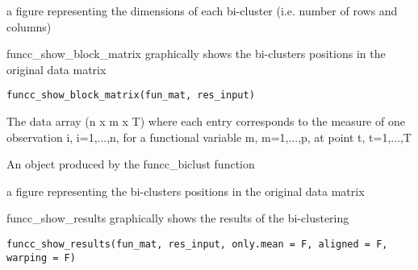 \documentclass[a4paper]{book}
\begin{document}
%
\begin{Value}
a figure representing the dimensions of each bi-cluster (i.e. number of rows and columns)
\end{Value}
%
\begin{Description}\relax
funcc\_show\_block\_matrix graphically shows the bi-clusters positions in the original data matrix
\end{Description}
%
\begin{Usage}
\begin{verbatim}
funcc_show_block_matrix(fun_mat, res_input)
\end{verbatim}
\end{Usage}
%
\begin{Arguments}
\begin{ldescription}
\item[\code{fun\_mat}] The data array (n x m x T) where each entry corresponds to the measure of one observation i, i=1,...,n, for a functional variable m, m=1,...,p, at point t, t=1,...,T

\item[\code{res\_input}] An object produced by the funcc\_biclust function
\end{ldescription}
\end{Arguments}
%
\begin{Value}
a figure representing the bi-clusters positions in the original data matrix
\end{Value}
%
\begin{Description}\relax
funcc\_show\_results graphically shows the results of the bi-clustering
\end{Description}
%
\begin{Usage}
\begin{verbatim}
funcc_show_results(fun_mat, res_input, only.mean = F, aligned = F, warping = F)
\end{verbatim}
\end{Usage}
%
\end{document}
